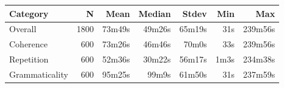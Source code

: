 \begin{tabular}{lrrrrrr}
\toprule
Category & N & Mean & Median & Stdev & Min & Max \\
\midrule
Overall & 1800 & 73m49s & 49m26s & 65m19s & 31s & 239m56s \\
Coherence & 600 & 73m26s & 46m46s & 70m0s & 33s & 239m56s \\
Repetition & 600 & 52m36s & 30m22s & 56m17s & 1m3s & 234m38s \\
Grammaticality & 600 & 95m25s & 99m9s & 61m50s & 31s & 237m59s \\
\bottomrule
\end{tabular}
